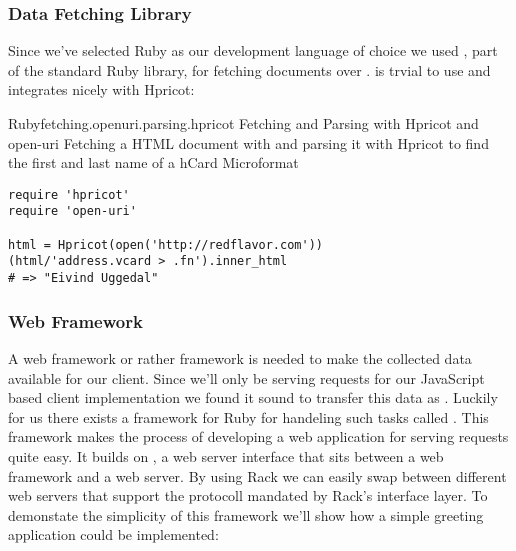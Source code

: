 \subsubsection{Data Fetching Library}

Since we've selected Ruby as our development language of choice we used
, part of the standard Ruby library, for fetching
documents over %
.
 is trvial to use and integrates nicely with Hpricot:

\begin{scode}{Ruby}{fetching.openuri.parsing.hpricot}{%
  Fetching and Parsing with Hpricot and open-uri}{%
  Fetching a HTML document with 
  and parsing it with Hpricot to find the first and
  last name of a hCard Microformat}
\begin{lstlisting}
require 'hpricot'
require 'open-uri'

html = Hpricot(open('http://redflavor.com'))
(html/'address.vcard > .fn').inner_html
# => "Eivind Uggedal"
\end{lstlisting}
\end{scode}


\subsubsection{ Web Framework}

A web framework or rather 
framework is needed to make the
collected data available for our client. Since we'll only be serving requests
for our JavaScript based client implementation we found it sound to transfer
this data as %
.
Luckily for us there exists a framework for Ruby for handeling such tasks
called %
.
This framework makes the process of developing a web application for serving
 requests quite easy. It builds on %
,
a web server interface that sits between a web framework and a web server. By
using Rack we can easily swap between different web servers that support the
protocoll mandated by Rack's interface layer. To demonstate the simplicity of
this framework we'll show how a simple greeting application could be
implemented:

